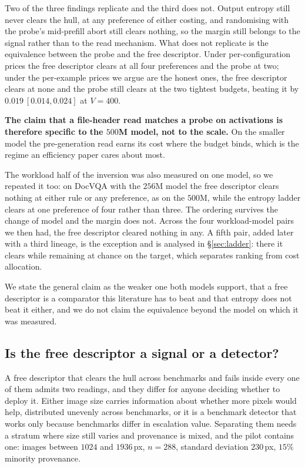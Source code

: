\documentclass[10pt,twocolumn]{article}
\theoremstyle{plain}
\begin{document}
Two of the three findings replicate and the third does not. Output entropy
still never clears the hull, at any preference of either costing, and
randomising with the probe's mid-prefill abort still clears nothing, so the
margin still belongs to the signal rather than to the read mechanism. What does
not replicate is the equivalence between the probe and the free descriptor.
Under per-configuration prices the free descriptor clears at all four
preferences and the probe at two; under the per-example prices we argue are the
honest ones, the free descriptor clears at none and the probe still clears at
the two tightest budgets, beating it by $0.019\ [0.014, 0.024]$ at $V{=}400$.

\textbf{The claim that a file-header read matches a probe on activations is
therefore specific to the $500$M model, not to the scale.} On the smaller model
the pre-generation read earns its cost where the budget binds, which is the
regime an efficiency paper cares about most.

The workload half of the inversion was also measured on one model, so we
repeated it too: on DocVQA with the $256$M model the free descriptor clears
nothing at either rule or any preference, as on the $500$M, while the entropy
ladder clears at one preference of four rather than three. The ordering
survives the change of model and the margin does not. Across the four
workload-model pairs we then had, the free descriptor cleared nothing in any.
A fifth pair, added later with a third lineage, is the exception and is
analysed in \S\ref{sec:ladder}: there it clears while remaining at chance on
the target, which separates ranking from cost allocation.

We state the general claim as the weaker one both models support, that a free descriptor is a comparator this
literature has to beat and that entropy does not beat it either, and we do not
claim the equivalence beyond the model on which it was measured.


\subsection{Is the free descriptor a signal or a detector?}

A free descriptor that clears the hull across
benchmarks and fails inside every one of them admits two readings, and they
differ for anyone deciding whether to deploy it. Either image size carries
information about whether more pixels would help, distributed unevenly across
benchmarks, or it is a benchmark detector that works only because benchmarks
differ in escalation value. Separating them needs a stratum where size still
varies and provenance is mixed, and the pilot contains one: images between
$1024$ and $1936$\,px, $n=288$, standard deviation $230$\,px, $15\%$ minority
provenance.
\end{document}

